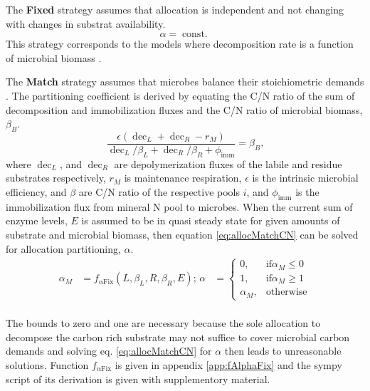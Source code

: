 The \textbf{Fixed} strategy assumes that allocation is independent
and not changing with changes in substrat availability. 
\begin{equation}
\label{eq:allocFixed}
\alpha = \operatorname{const.}
\end{equation}
This strategy corresponds to the models where decomposition rate is a function
of microbial biomass \citep{Wutzler08}.
 
The \textbf{Match} strategy assumes that microbes balance their stoichiometric
demands \citep{Moorhead12}. The partitioning coefficient is derived by equating
the C/N ratio of the sum of decomposition and immobilization fluxes and the C/N
ratio of microbial biomass, $\beta_B$.
\begin{equation}
\label{eq:allocMatchCN}
\frac{\epsilon (\operatorname{dec}_L + \operatorname{dec}_R - r_M)}{
\operatorname{dec}_L/\beta_L + \operatorname{dec}_R/\beta_R  +
\phi_{\operatorname{imm}} } =
\beta_B
\text{,}
\end{equation}
where $\operatorname{dec}_L$, and $\operatorname{dec}_R$ are
depolymerization fluxes of the labile and residue substrates
respectively, $r_M$ is maintenance respiration, $\epsilon$ is the 
intrinsic microbial efficiency, and $\beta$ are C/N ratio of
the respective pools $i$, and $\phi_{\operatorname{imm}}$ is the immobilization
flux from mineral N pool to microbes.
When the current sum of enzyme levels, $E$ is assumed to be in quasi steady
state for given amounts of substrate and microbial biomass, then equation
\ref{eq:allocMatchCN} can be solved for allocation partitioning, $\alpha$.
\begin{subequations}
\label{eq:allocMatch}
\begin{align}
\alpha_M &= f_{\operatorname{{\alpha}Fix}}(L,\beta_L,R,\beta_R, E); \,
\alpha &= \begin{cases}
  0,  & \text{if} \alpha_M \le 0 \\
  1,  & \text{if} \alpha_M \ge 1 \\
  \alpha_M, & \text{otherwise}
\end{cases} \\  
\end{align}
\end{subequations}

The bounds to zero and one are necessary because the sole
allocation to decompose the carbon rich substrate may not suffice to
cover microbial carbon demands and solving eq. \ref{eq:allocMatchCN} for
$\alpha$ then leads to unreasonable solutions.
Function $f_{\operatorname{{\alpha}Fix}}$ is given in appendix
\ref{app:fAlphaFix} and the sympy script of its 
derivation is given with supplementory material. 

